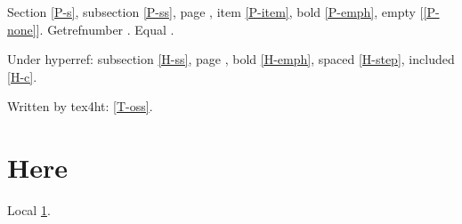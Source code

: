 \documentclass{article}
\newcounter{other}
\begin{document}
Section \ref{P-s}, subsection \ref{P-ss}, page \pageref{P-front},
item \ref{P-item}, bold \ref{P-emph}, empty [\ref{P-none}].
Getrefnumber .
Equal .

Under hyperref: subsection \ref{H-ss}, page \pageref{H-front},
bold \ref{H-emph}, spaced \ref{H-step}, included \ref{H-c}.

Written by tex4ht: \ref{T-oss}.

\section{Here}\label{here}
Local \ref{here}.
\end{document}
